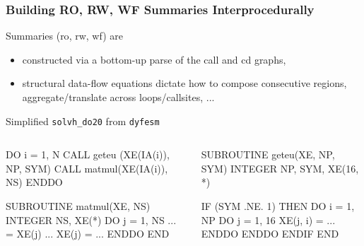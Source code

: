 \documentclass{beamer}
\newcommand{\emp}[1]{\textcolor{DikuRed}{ #1}}
\begin{document}
\begin{frame}[fragile,t]
  \frametitle{Building RO, RW, WF Summaries Interprocedurally}

Summaries ({\sc ro}, {\sc rw}, {\sc wf}) are
\begin{itemize}
    \item constructed via a bottom-up parse of the {\sc call} and {\sc cd} graphs,
    \item structural data-flow equations dictate how to compose consecutive regions,
            aggregate/translate across loops/callsites, ...
\end{itemize}

\pause

\begin{block}{Simplified {\tt solvh\_do20} from {\tt dyfesm}} \vspace{-1ex}
\begin{columns} 
\begin{colorcode}[fontsize=\scriptsize]
\emp{DO i = 1, N}
    CALL geteu (XE(IA(i)), NP, SYM)
    CALL matmul(XE(IA(i)), NS)
\emp{ENDDO}

SUBROUTINE matmul(XE, NS)
  INTEGER NS, XE(*)
  DO j = 1, NS
    ...   = XE(j) ...
    XE(j) = ...
  ENDDO 
END
\end{colorcode}
\begin{colorcode}[fontsize=\scriptsize]
SUBROUTINE geteu(XE, NP, SYM)
  INTEGER NP, SYM, XE(16, *)
  
  IF (SYM .NE. 1) THEN
    DO i = 1, NP
      DO j = 1, 16
        XE(j, i) = ...
      ENDDO 
    ENDDO
  ENDIF
END
\end{colorcode}
\end{columns}
\end{block}

\end{frame}


\end{document}
